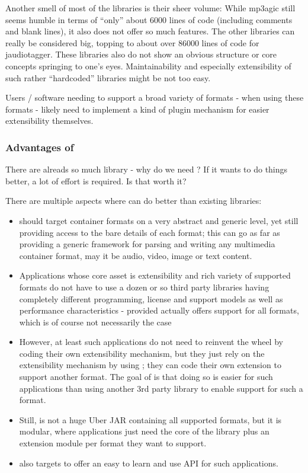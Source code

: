 Another smell of most of the libraries is their sheer volume: While mp3agic still seems humble in terms of ``only'' about 6000 lines of code (including comments and blank lines), it also does not offer so much features. The other libraries can really be considered big, topping to about over 86000 lines of code for jaudiotagger. These libraries also do not show an obvious structure or core concepts springing to one's eyes. Maintainability and especially extensibility of such rather ``hardcoded'' libraries might be not too easy.    

Users / software needing to support a broad variety of formats - when using these formats - likely need to implement a kind of plugin mechanism for easier extensibility themselves.


\subsubsection{Advantages of \LibName{}}
\label{sec:AdvantagesofLibName}

There are alreads so much library - why do we need \LibName{}? If it wants to do things better, a lot of effort is required. Is that worth it?

There are multiple aspects where \LibName{} can do better than existing libraries:
\begin{itemize}
\item \LibName{} should target container formats on a very abstract and generic level, yet still providing access to the bare details of each format; this can go as far as providing a generic framework for parsing and writing any multimedia container format, may it be audio, video, image or text content.
\item Applications whose core asset is extensibility and rich variety of supported formats do not have to use a dozen or so third party libraries having completely different programming, license and support models as well as performance characteristics - provided \LibName{} actually offers support for all formats, which is of course not necessarily the case
\item However, at least such applications do not need to reinvent the wheel by coding their own extensibility mechanism, but they just rely on the extensibility mechanism by using \LibName{}; they can code their own \LibName{} extension to support another format. The goal of \LibName{} is that doing so is easier for such applications than using another 3rd party library to enable support for such a format.
\item Still, \LibName{} is not a huge Uber JAR containing all supported formats, but it is modular, where applications just need the core of the library plus an extension module per format they want to support.
\item \LibName{} also targets to offer an easy to learn and use API for such applications.
\end{itemize}

